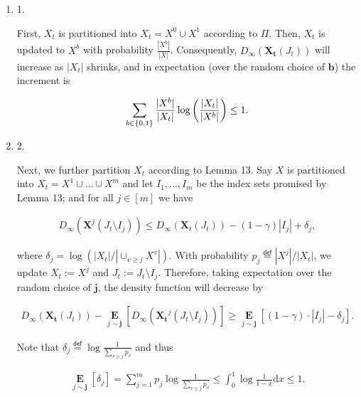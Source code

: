 \begin{enumerate}


\item[] 
1. 


First, $X_{t}$ is partitioned into $X_{t}=X^{0}\cup X^{1}$ according to $\Pi$.
Then, $X_{t}$ is updated to $X^{b}$ with probability $\frac{|X^{b}|}{|X|}$.
Consequently, $D_{\infty}(\bm{X_{t}}(J_{t}))$ will increase as $|X_{t}|$ shrinks, and in expectation (over the random choice of $\bm{b}$) the increment is\par


\[\begin{gathered}
\sum_{b\in\left\{0,1\right\}}\frac{|X^{b}|}{|X_{t}|}\log\bigg{(}\frac{|X_{t}|}{|X^{b}|}\bigg{)}\leq 1.
\end{gathered}\]





\item[] 
2. 


Next, we further partition $X_{t}$ according to Lemma 13.
Say $X$ is partitioned into $X_{t}=X^{1}\cup\dots\cup X^{m}$ and let $I_{1},\dots,I_{m}$ be the index sets promised by Lemma 13; and for all $j\in[m]$ we have\par


\[\begin{gathered}
D_{\infty}(\bm{X}^{j}(J_{t}\setminus I_{j}))\leq D_{\infty}(\bm{X}_{t}(J_{t}))-(1-\gamma)|I_{j}|+\delta_{j},
\end{gathered}\]


where $\delta_{j}=\log(|X_{t}|/|\cup_{v\geq j}X^{v}|)$.
With probability $p_{j}\stackrel{{\scriptstyle\mathsf{def}}}{{=}}|X^{j}|/|X_{t}|$, we update $X_{t}:=X^{j}$ and $J_{t}:=J_{t}\setminus I_{j}$.
Therefore, taking expectation over the random choice of $\bm{j}$, the density function will decrease by\par


\[\begin{gathered}
D_{\infty}(\bm{X_{t}}(J_{t}))-\operatorname*{\mathbf{E}}_{j\sim\bm{j}}\left[D_{\infty}(\bm{X_{t}}^{j}(J_{t}\setminus I_{j}))\right]\geq\operatorname*{\mathbf{E}}_{j\sim\bm{j}}\left[(1-\gamma)\cdot|I_{j}|-\delta_{j}\right].
\end{gathered}\]


Note that $\delta_{j}\stackrel{{\scriptstyle\mathsf{def}}}{{=}}\log\frac{1}{\sum_{v\geq j}p_{v}}$ and thus\par


\[\begin{gathered}
\operatorname*{\mathbf{E}}_{j\sim\bm{j}}\left[\delta_{j}\right]=\sum_{j=1}^{m}p_{j}\log\frac{1}{\sum_{v\geq j}p_{v}}\leq\int_{0}^{1}\log\frac{1}{1-x}\mathrm{d}x\leq 1.
\end{gathered}\]





\end{enumerate}




